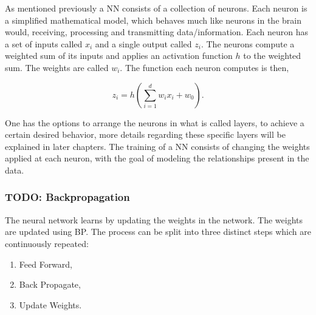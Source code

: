 As mentioned previously a \gls{NN} consists of a collection of neurons. Each
neuron is a simplified mathematical model, which behaves much like neurons in
the brain would, receiving, processing and transmitting data/information. Each
neuron has a set of inputs called $x_i$ and a single output called $z_i$. The
neurons compute a weighted sum of its inputs and applies an activation function
$h$ to the weighted sum. The weights are called $w_i$. The function each neuron
computes is then,

\begin{equation}
    z_i = h\left(
        \sum_{i = 1}^d w_ix_i + w_0
    \right).
\end{equation}

One has the options to arrange the neurons in what is called layers, to achieve
a certain desired behavior, more details regarding these specific layers will
be explained in later chapters.
The training of a \gls{NN} consists of changing the weights applied at each
neuron, with the goal of modeling the relationships present in the data.

\subsubsection{TODO: Backpropagation}\label{sec:BP}

The neural network learns by updating the weights in the network. The weights
are updated using \gls{BP}. The process can be split into three distinct steps
which are continuously repeated:

\begin{enumerate}
    \item Feed Forward,
    \item Back Propagate,
    \item Update Weights.
\end{enumerate}

